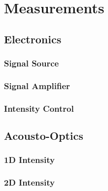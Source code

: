 \chapter{Measurements}

\section{Electronics}

\subsection{Signal Source}

\subsection{Signal Amplifier}


\subsection{Intensity Control}


\section{Acousto-Optics}

\subsection{1D Intensity}




\subsection{2D Intensity}

